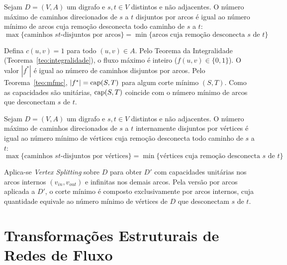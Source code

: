 \begin{teorema}
Sejam $D = (V, A)$ um digrafo e $s, t \in V$ distintos e não adjacentes. O número máximo de caminhos direcionados de $s$ a $t$ disjuntos por arcos é igual ao número mínimo de arcos cuja remoção desconecta todo caminho de $s$ a $t$:
\begin{equation}
    \max\{\text{caminhos $st$-disjuntos por arcos}\} = \min\{\text{arcos cuja remoção desconecta $s$ de $t$}\}
\end{equation}
\end{teorema}

\begin{demonstracao}
Defina $c(u,v) = 1$ para todo $(u,v) \in A$. Pelo Teorema da Integralidade (Teorema~\ref{teo:integralidade}), o fluxo máximo é inteiro ($f(u,v) \in \{0, 1\}$). O valor $|f^*|$ é igual ao número de caminhos disjuntos por arcos. Pelo Teorema~\ref{teo:mfmc}, $|f^*| = \operatorname{cap}(S,T)$ para algum corte mínimo $(S,T)$. Como as capacidades são unitárias, $\operatorname{cap}(S,T)$ coincide com o número mínimo de arcos que desconectam $s$ de $t$.
\end{demonstracao}

\begin{teorema}
Sejam $D = (V, A)$ um digrafo e $s, t \in V$ distintos e não adjacentes. O número máximo de caminhos direcionados de $s$ a $t$ internamente disjuntos por vértices é igual ao número mínimo de vértices cuja remoção desconecta todo caminho de $s$ a $t$:
\begin{equation}
    \max\{\text{caminhos $st$-disjuntos por vértices}\} = \min\{\text{vértices cuja remoção desconecta $s$ de $t$}\}
\end{equation}
\end{teorema}

\begin{demonstracao}
Aplica-se \textit{Vertex Splitting} sobre $D$ para obter $D'$ com capacidades unitárias nos arcos internos $(v_{in}, v_{out})$ e infinitas nos demais arcos. Pela versão por arcos aplicada a $D'$, o corte mínimo é composto exclusivamente por arcos internos, cuja quantidade equivale ao número mínimo de vértices de $D$ que desconectam $s$ de $t$.
\end{demonstracao}


\section{Transformações Estruturais de Redes de Fluxo}

